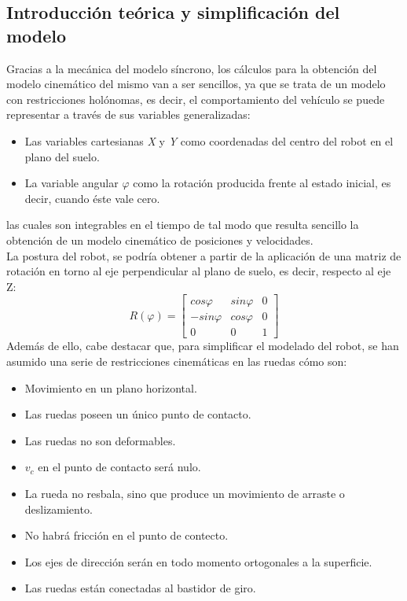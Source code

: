 \documentclass[a4paper,twoside]{article}
\begin{document}
	\subsection{Introducción teórica y simplificación del modelo}
	Gracias a la mecánica del modelo síncrono, los cálculos para la obtención del modelo cinemático del mismo van a ser sencillos, ya que se trata de un modelo con restricciones holónomas, es decir, el comportamiento del vehículo se puede representar a través de sus variables generalizadas:
	\begin{itemize}
		\item Las variables cartesianas \textit{X} y \textit{Y} como coordenadas del centro del robot en el plano del suelo.
		\item La variable angular $\varphi$ como la rotación producida frente al estado inicial, es decir, cuando éste vale cero.
	\end{itemize}
	las cuales son integrables en el tiempo de tal modo que resulta sencillo la obtención de un modelo cinemático de posiciones y velocidades.\\
	La postura del robot, se podría obtener a partir de la aplicación de una matriz de rotación en torno al eje perpendicular al plano de suelo, es decir, respecto al eje Z:
	\begin{equation}
		R(\varphi)=
		\begin{bmatrix}
			cos\varphi & sin\varphi & 0 \\
			-sin\varphi & cos\varphi & 0 \\
			0 & 0 & 1
		\end{bmatrix}
	\end{equation}
	Además de ello, cabe destacar que, para simplificar el modelado del robot, se han asumido una serie de restricciones cinemáticas en las ruedas cómo son:
	\begin{itemize}
		\item Movimiento en un plano horizontal.
		\item Las ruedas poseen un único punto de contacto.
		\item Las ruedas no son deformables.
		\item $v_c$ en el punto de contacto será nulo.
		\item La rueda no resbala, sino que produce un movimiento de arraste o deslizamiento.
		\item No habrá fricción en el punto de contecto.
		\item Los ejes de dirección serán en todo momento ortogonales a la superficie.
		\item Las ruedas están conectadas al bastidor de giro.
	\end{itemize}
\end{document}
